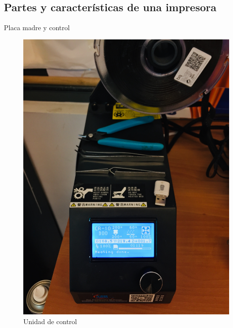 \documentclass{beamer}
\begin{document}
	\subsection{Partes y características de una impresora}
	\begin{frame}{Placa madre y control}
		\begin{figure}
			\includegraphics[height=0.8\textheight]{images/control}
			\caption{Unidad de control}
		\end{figure}
	\end{frame}
\end{document}
